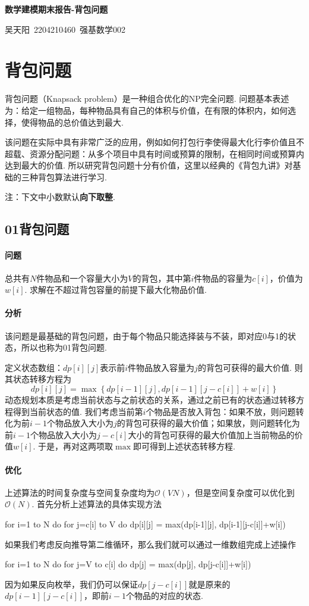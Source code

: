 \documentclass[12pt, a4paper, oneside]{ctexart}
\numberwithin{equation}{section}  %
\newenvironment{myTitle}[1]{
    \begin{center}
    {\zihao{-2}\bf #1\\}
    \zihao{-4}\it
}{\end{center}}  %
\newcounter{problem}  %
\def\O{\mathcal{O}}         %
\begin{document}
\clearpage
\begin{myTitle}{数学建模期末报告-背包问题}
    吴天阳\ 2204210460\ 强基数学002
\end{myTitle}

\section{背包问题}
背包问题（Knapsack problem）是一种组合优化的NP完全问题. 问题基本表述为：给定一组物品，每种物品具有自己的体积与价值，在有限的体积内，如何选择，使得物品的总价值达到最大.

该问题在实际中具有非常广泛的应用，例如如何打包行李使得最大化行李价值且不超载、资源分配问题：从多个项目中具有时间或预算的限制，在相同时间或预算内达到最大的价值. 所以研究背包问题十分有价值，这里以经典的《背包九讲》对基础的三种背包算法进行学习.

注：下文中小数默认\textbf{向下取整}.
\subsection{01背包问题}
\paragraph*{问题}总共有$N$件物品和一个容量大小为$V$的背包，其中第$i$件物品的容量为$c[i]$，价值为$w[i]$. 求解在不超过背包容量的前提下最大化物品价值.
\paragraph*{分析}该问题是最基础的背包问题，由于每个物品只能选择装与不装，即对应0与1的状态，所以也称为01背包问题.

定义状态数组：$dp[i][j]$表示前$i$件物品放入容量为$j$的背包可获得的最大价值. 则其状态转移方程为
\begin{equation*}
        dp[i][j] = \max\left\{dp[i-1][j],dp[i-1][j-c[i]]+w[i]\right\}
\end{equation*}
动态规划本质是考虑当前状态与之前状态的关系，通过之前已有的状态通过转移方程得到当前状态的值. 我们考虑当前第$i$个物品是否放入背包：如果不放，则问题转化为前$i-1$个物品放入大小为$j$的背包可获得的最大价值；如果放，则问题转化为前$i-1$个物品放入大小为$j-c[i]$大小的背包可获得的最大价值加上当前物品的价值$w[i]$. 于是，再对这两项取$\max$即可得到上述状态转移方程.

\paragraph*{优化}上述算法的时间复杂度与空间复杂度均为$\O(VN)$，但是空间复杂度可以优化到$\O(N)$. 首先分析上述算法的具体实现方法
\begin{pythoncode}
for i=1 to N do
    for j=c[i] to V do
        dp[i][j] = max(dp[i-1][j], dp[i-1][j-c[i]]+w[i])
\end{pythoncode}
如果我们考虑反向推导第二维循环，那么我们就可以通过一维数组完成上述操作
\begin{pythoncode}
for i=1 to N do
    for j=V to c[i] do
        dp[j] = max(dp[j], dp[j-c[i]]+w[i])
\end{pythoncode}
因为如果反向枚举，我们仍可以保证$dp[j-c[i]]$就是原来的$dp[i-1][j-c[i]]$，即前$i-1$个物品的对应的状态.
\end{document}
